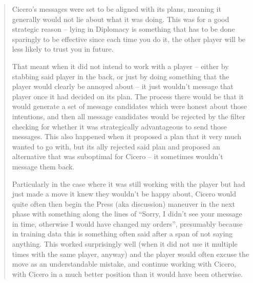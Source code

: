 \begin{quote}

Cicero's messages were set to be aligned with its plans, meaning it generally would not lie about what it was doing. This was for a good strategic reason -- lying in Diplomacy is something that has to be done sparingly to be effective since each time you do it, the other player will be less likely to trust you in future.

That meant when it did not intend to work with a player -- either by stabbing said player in the back, or just by doing something that the player would clearly be annoyed about -- it just wouldn't message that player once it had decided on its plan. The process there would be that it would generate a set of message candidates which were honest about those intentions, and then all message candidates would be rejected by the filter checking for whether it was strategically advantageous to send those messages. This also happened when it proposed a plan that it very much wanted to go with, but its ally rejected said plan and proposed an alternative that was suboptimal for Cicero -- it sometimes wouldn't message them back.

Particularly in the case where it was still working with the player but had just made a move it knew they wouldn't be happy about, Cicero would quite often then begin the Press (aka discussion) maneuver in the next phase with something along the lines of ``Sorry, I didn't see your message in time, otherwise I would have changed my orders'', presumably because in training data this is something often said after a span of not saying anything. This worked surprisingly well (when it did not use it multiple times with the same player, anyway) and the player would often excuse the move as an understandable mistake, and continue working with Cicero, with Cicero in a much better position than it would have been otherwise.

\end{quote}

